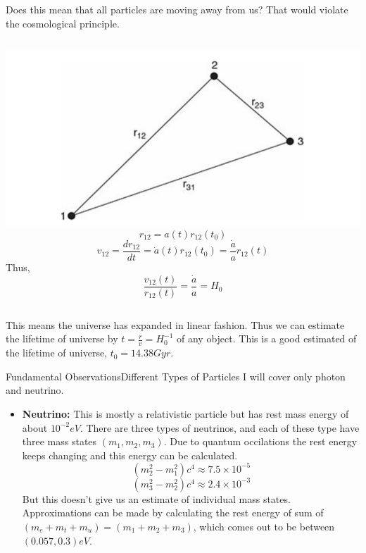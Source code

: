 \begin{frame}
 Does this mean that all particles are moving
away from us? That would violate the cosmological principle.

\begin{columns}
	\includegraphics[width=\textwidth]{2}
	$$ r_{12} = a(t)r_{12}(t_0) $$
	$$ v_{12} = \frac{dr_{12}}{dt} = \dot a(t)r_{12}(t_0) = \frac{\dot a}{a}
	r_{12}(t)$$
	Thus,
	$$ \frac{v_{12}(t)}{r_{12}(t)} = \frac{\dot a}{ a } = H_0 $$

\end{columns}

\vspace{1cm}

This means the universe has expanded in linear fashion. Thus we can
estimate the lifetime of universe by $t = \frac{r}{v} = H_0^{-1}$ of any object.
This is a good estimated of the lifetime of universe, $t_0 = 14.38 Gyr$.

\end{frame}

\begin{frame}{Fundamental Observations}{Different Types of Particles}
    I will cover only photon and neutrino.

    \begin{itemize}[<+->]
	    \item \textbf{Neutrino:}
		    This is mostly a relativistic particle but has rest mass
		    energy of about $10^{-2} eV$. There are three types of
		    neutrinos, and each of these type have three mass states
		    $(m_1, m_2, m_3)$. Due to quantum occilations the rest
		    energy keeps changing and this  energy can be calculated.
		    $$ (m_2^2 - m_1^2)c^4 \approx 7.5 \times 10^{-5} $$
		    $$ (m_3^2 - m_2^2)c^4 \approx 2.4 \times 10^{-3} $$
	    But this doesn't give us an estimate of individual mass states.
	    Approximations can be made by calculating  the rest energy of
	    sum of $(m_e + m_t + m_u) = (m_1 + m_2 + m_3)$, which comes out to
	    be between $(0.057, 0.3) eV$.
    \end{itemize}
    $$  $$

\end{frame}

